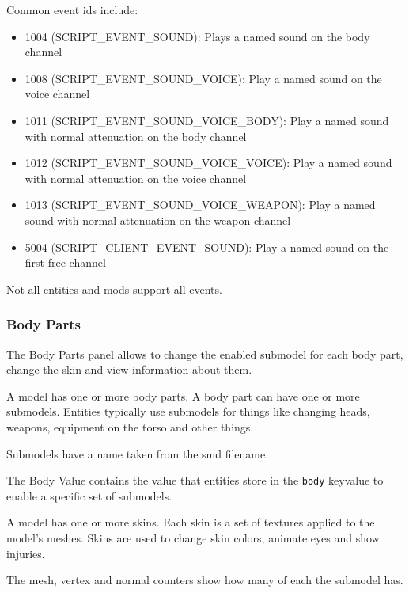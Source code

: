 \documentclass[10pt, a4paper, titlepage, oneside]{article}
\newcommand{\code}[1]{\mbox{\texttt{#1}}}
\begin{document}
\vspace{\baselineskip}
Common event ids include:
\begin{itemize}
\item 1004 (SCRIPT\_EVENT\_SOUND): Plays a named sound on the body channel
\item 1008 (SCRIPT\_EVENT\_SOUND\_VOICE): Play a named sound on the voice channel
\item 1011 (SCRIPT\_EVENT\_SOUND\_VOICE\_BODY): Play a named sound with normal attenuation on the body channel
\item 1012 (SCRIPT\_EVENT\_SOUND\_VOICE\_VOICE): Play a named sound with normal attenuation on the voice channel
\item 1013 (SCRIPT\_EVENT\_SOUND\_VOICE\_WEAPON): Play a named sound with normal attenuation on the weapon channel
\item 5004 (SCRIPT\_CLIENT\_EVENT\_SOUND): Play a named sound on the first free channel
\end{itemize}

\vspace{\baselineskip}
Not all entities and mods support all events.

\subsubsection{Body Parts}

The Body Parts panel allows to change the enabled submodel for each body part, change the skin and view information about them.

\vspace{\baselineskip}
A model has one or more body parts. A body part can have one or more submodels. Entities typically use submodels for things like changing heads, weapons, equipment on the torso and other things.

\vspace{\baselineskip}
Submodels have a name taken from the smd filename.

\vspace{\baselineskip}
The Body Value contains the value that entities store in the \code{body} keyvalue to enable a specific set of submodels.

\vspace{\baselineskip}
A model has one or more skins. Each skin is a set of textures applied to the model's meshes. Skins are used to change skin colors, animate eyes and show injuries.

\vspace{\baselineskip}
The mesh, vertex and normal counters show how many of each the submodel has.
\end{document}
